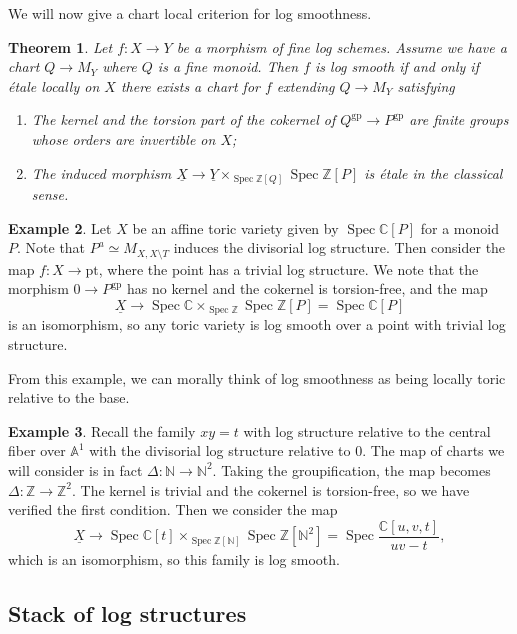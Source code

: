 \documentclass{amsart}
\newtheorem{thm}{Theorem}[section]
\theoremstyle{definition}
\newtheorem{exm}[thm]{Example}
\theoremstyle{remark}
\theoremstyle{plain}
\theoremstyle{definition}
\theoremstyle{remark}
\newcommand{\A}{\mathbb{A}}
\newcommand{\N}{\mathbb{N}}
\newcommand{\C}{\mathbb{C}}
\newcommand{\Z}{\mathbb{Z}}
\newcommand{\mr}[1]{\mathrm{#1}}
\newcommand{\ul}[1]{\underline{#1}}
\newcommand{\1}{\mathbf{1}}
\newcommand{\2}{\mathbf{2}}
\newcommand{\3}{\mathbf{3}}
\DeclareMathOperator{\Spec}{Spec}
\begin{document}
We will now give a chart local criterion for log smoothness.

\begin{thm}
    Let \(f \colon X \to Y\) be a morphism of fine log schemes. Assume we have a chart \(Q \to M_Y\) where \(Q\) is a fine monoid. Then \(f\) is log smooth if and only if \'etale locally on \(X\) there exists a chart for \(f\) extending \(Q \to M_Y\) satisfying
    \begin{enumerate}
        \item The kernel and the torsion part of the cokernel of \(Q^{\mr{gp}} \to P^{\mr{gp}}\) are finite groups whose orders are invertible on \(X\);
        \item The induced morphism \(\ul{X} \to \ul{Y} \times_{\Spec \Z[Q]} \Spec \Z[P]\) is \'etale in the classical sense.
    \end{enumerate}
\end{thm}

\begin{exm}
    Let \(X\) be an affine toric variety given by \(\Spec \C[P]\) for a monoid \(P\). Note that \(P^a \simeq M_{X, X \setminus T}\) induces the divisorial log structure. Then consider the map \(f \colon X \to \mr{pt}\), where the point has a trivial log structure. We note that the morphism \(0 \to P^{\mr{gp}}\) has no kernel and the cokernel is torsion-free, and the map
    \[ \ul{X} \to \Spec \C \times_{\Spec \Z} \Spec \Z[P] = \Spec \C[P] \]
    is an isomorphism, so any toric variety is log smooth over a point with trivial log structure.
\end{exm}

From this example, we can morally think of log smoothness as being locally toric relative to the base.

\begin{exm}
    Recall the family \(xy = t\) with log structure relative to the central fiber over \(\A^1\) with the divisorial log structure relative to \(0\). The map of charts we will consider is in fact \(\Delta \colon \N \to \N^2\). Taking the groupification, the map becomes \(\Delta \colon \Z \to \Z^2\). The kernel is trivial and the cokernel is torsion-free, so we have verified the first condition. Then we consider the map
    \[ \ul{X} \to \Spec \C[t] \times_{\Spec \Z[\N]} \Spec \Z[\N^2] = \Spec \frac{\C[u,v,t]}{uv-t}, \]
    which is an isomorphism, so this family is log smooth.
\end{exm}

\subsection{Stack of log structures}%
\label{sub:Stack of log structures}
\end{document}

